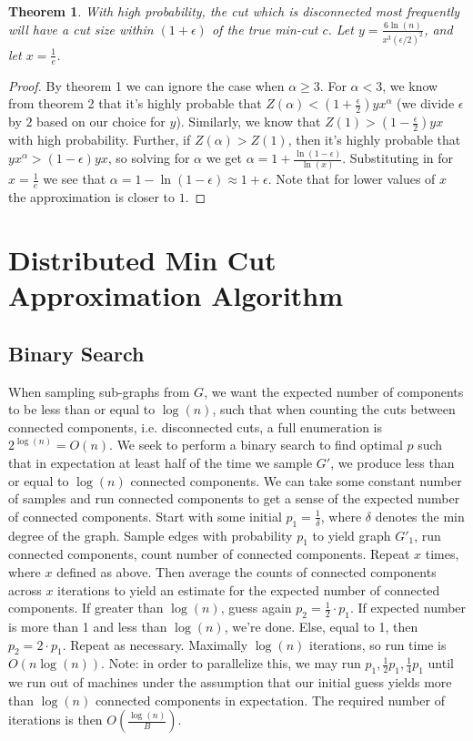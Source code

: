 \documentclass[12pt]{article}
\newtheorem{theorem}{Theorem}
\begin{document}
\begin{theorem}
With high probability, the cut which is disconnected most frequently will have a cut size within $(1+\epsilon)$ of the true min-cut $c$. Let $y = \frac{6 \ln(n)}{x^3 (\epsilon/2)^2}$, and let $x = \frac{1}{e}$.
\end{theorem}

\begin{proof}
By theorem 1 we can ignore the case when $\alpha \geq 3$. For $\alpha < 3$, we know from theorem 2 that it's highly probable that $Z(\alpha) < (1+\frac{\epsilon}{2})yx^\alpha$ (we divide $\epsilon$ by $2$ based on our choice for $y$).
Similarly, we know that $Z(1) > (1-\frac{\epsilon}{2}) yx$ with high probability. Further, if $Z(\alpha) > Z(1)$, then it's highly probable that $yx^\alpha > (1-\epsilon) yx$, so solving for $\alpha$ we get $\alpha = 1 + \frac{\ln(1-\epsilon)}{\ln(x)}$. Substituting in for $x = \frac{1}{e}$ we see that $\alpha = 1 - \ln(1 - \epsilon) \approx 1+\epsilon$. Note that for lower values of $x$ the approximation is closer to $1$.
\end{proof}

\section{Distributed Min Cut Approximation Algorithm}

\subsection{Binary Search}

When sampling sub-graphs from $G$, we want the expected number of components to be less than or equal to $\log(n)$, such that when counting the cuts between connected components, i.e. disconnected cuts, a full enumeration is $2^{\log(n)} = O(n)$. We seek to perform a binary search to find optimal $p$ such that in expectation at least half of the time we sample $G'$, we produce less than or equal to $\log(n)$ connected components. We can take some constant number of samples and run connected components to get a sense of the expected number of connected components. Start with some initial $p_1 = \frac{1}{\delta}$, where $\delta$ denotes the min degree of the graph. Sample edges with probability $p_1$ to yield graph $G'_1$, run connected components, count number of connected components. Repeat $x$ times, where $x$ defined as above. Then average the counts of connected components across $x$ iterations to yield an estimate for the expected number of connected components. If greater than $\log(n)$, guess again $p_2 = \frac{1}{2} \cdot p_1$. If expected number is more than 1 and less than $\log(n)$, we're done. Else, equal to 1, then $p_2 = 2 \cdot p_1$. Repeat as necessary. Maximally $\log(n)$ iterations, so run time is $O(n \log (n))$. Note: in order to parallelize this, we may run $p_1, \frac{1}{2}p_1, \frac{1}{4}p_1$ until we run out of machines under the assumption that our initial guess yields more than $\log(n)$ connected components in expectation. The required number of iterations is then $O(\frac{\log(n)}{B})$.
\end{document}
